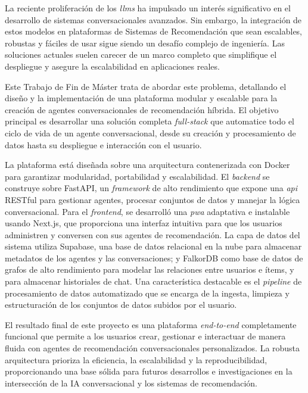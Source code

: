 La reciente proliferación de los \textit{\acp{llm}} ha impulsado un interés significativo en el desarrollo de sistemas conversacionales avanzados. Sin embargo, la integración de estos modelos en plataformas de Sistemas de Recomendación que sean escalables, robustas y fáciles de usar sigue siendo un desafío complejo de ingeniería. Las soluciones actuales suelen carecer de un marco completo que simplifique el despliegue y asegure la escalabilidad en aplicaciones reales.

Este Trabajo de Fin de Máster trata de abordar este problema, detallando el diseño y la implementación de una plataforma modular y escalable para la creación de agentes conversacionales de recomendación híbrida. El objetivo principal es desarrollar una solución completa \textit{full-stack} que automatice todo el ciclo de vida de un agente conversacional, desde su creación y procesamiento de datos hasta su despliegue e interacción con el usuario.

La plataforma está diseñada sobre una arquitectura contenerizada con Docker para garantizar modularidad, portabilidad y escalabilidad. El \textit{backend} se construye sobre FastAPI, un \textit{framework} de alto rendimiento que expone una \textit{\ac{api}} RESTful para gestionar agentes, procesar conjuntos de datos y manejar la lógica conversacional. Para el \textit{frontend}, se desarrolló una \textit{\ac{pwa}} adaptativa e instalable usando Next.js, que proporciona una interfaz intuitiva para que los usuarios administren y conversen con sus agentes de recomendación. La capa de datos del sistema utiliza Supabase, una base de datos relacional en la nube para almacenar metadatos de los agentes y las conversaciones; y FalkorDB como base de datos de grafos de alto rendimiento para modelar las relaciones entre usuarios e ítems, y para almacenar historiales de chat. Una característica destacable es el \textit{pipeline} de procesamiento de datos automatizado que se encarga de la ingesta, limpieza y estructuración de los conjuntos de datos subidos por el usuario.

El resultado final de este proyecto es una plataforma \textit{end-to-end} completamente funcional que permite a los usuarios crear, gestionar e interactuar de manera fluida con agentes de recomendación conversacionales personalizados. La robusta arquitectura prioriza la eficiencia, la escalabilidad y la reproducibilidad, proporcionando una base sólida para futuros desarrollos e investigaciones en la intersección de la IA conversacional y los sistemas de recomendación.

